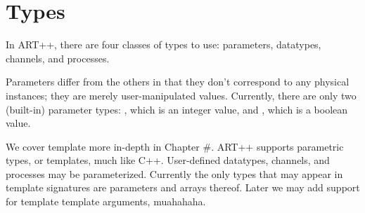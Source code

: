 
\chapter{Types}
\label{sec:types}

In ART++, there are four classes of types to use:
parameters, datatypes, channels, and processes.  

Parameters differ from the others in that they don't correspond
to any physical instances; they are merely user-manipulated values.  
Currently, there are only two (built-in) parameter types: 
\pint, which is an integer value,
and \pbool, which is a boolean value.  


We cover template more in-depth in Chapter #.  
ART++ supports parametric types, or templates, much like C++. 
User-defined datatypes, channels, and processes may be parameterized.  
Currently the only types that may appear in template signatures
are parameters and arrays thereof.  
Later we may add support for template template arguments, muahahaha.  


